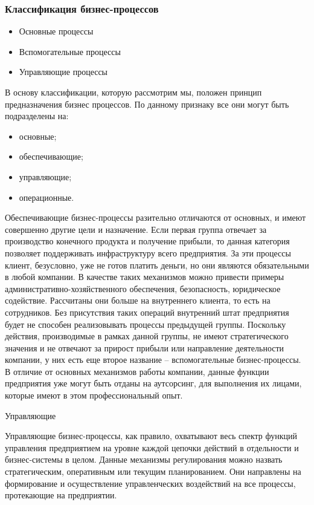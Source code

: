 \documentclass{../industrial-development}
\begin{document}
\begin{frame} \frametitle{Классификация бизнес-процессов}
	\begin{itemize}
		\item Основные процессы
		\item Вспомогательные процессы
		\item Управляющие процессы
	\end{itemize}
\end{frame}
\lecturenotes

В основу классификации, которую рассмотрим мы, положен принцип предназначения бизнес процессов. По данному признаку все они могут быть подразделены на:
\begin{itemize}
\item основные; 
\item обеспечивающие; 
\item управляющие; 
\item операционные.
\end{itemize}
Обеспечивающие бизнес-процессы разительно отличаются от основных, и имеют совершенно другие цели и назначение. Если первая группа отвечает за производство конечного продукта и получение прибыли, то данная категория позволяет поддерживать инфраструктуру всего предприятия. За эти процессы клиент, безусловно, уже не готов платить деньги, но они являются обязательными в любой компании. В качестве таких механизмов можно привести примеры административно-хозяйственного обеспечения, безопасность, юридическое содействие. Рассчитаны они больше на внутреннего клиента, то есть на сотрудников. Без присутствия таких операций внутренний штат предприятия будет не способен реализовывать процессы предыдущей группы. Поскольку действия, производимые в рамках данной группы, не имеют стратегического значения и не отвечают за прирост прибыли или направление деятельности компании, у них есть еще второе название – вспомогательные бизнес-процессы. В отличие от основных механизмов работы компании, данные функции предприятия уже могут быть отданы на аутсорсинг, для выполнения их лицами, которые имеют в этом профессиональный опыт.

Управляющие

Управляющие бизнес-процессы, как правило, охватывают весь спектр функций управления предприятием на уровне каждой цепочки действий в отдельности и бизнес-системы в целом. Данные механизмы регулирования можно назвать стратегическим, оперативным или текущим планированием. Они направлены на формирование и осуществление управленческих воздействий на все процессы, протекающие на предприятии.
\end{document}
